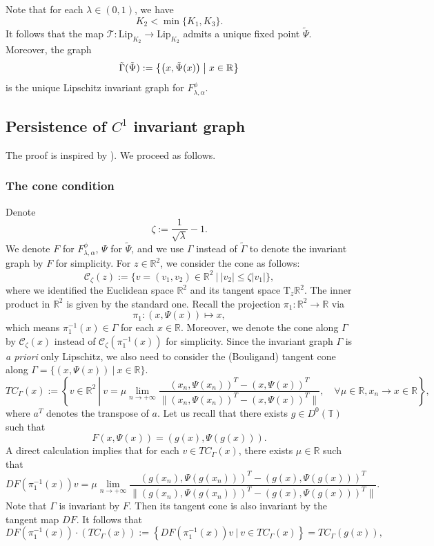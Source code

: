 \documentclass{amsart}
\newcommand{\R}{\mathbb{R}}
\newcommand{\T}{\mathbb{T}}
\begin{document}
	
	
	
	
	
	
	
	
	
	
	Note that for each $\lambda\in (0,1)$, we have
	\[K_2<\min\{K_1,K_3\}.\]
	It follows that the map $\mathcal{T} \colon \mathrm{Lip}_{K_2} \to \mathrm{Lip}_{K_2}$ admits a unique fixed point $\tilde{\Psi}$. Moreover, the graph
	\begin{equation}\label{tGp}
		\tilde{\Gamma}(\tilde{\Psi}) := \bigl\{ \bigl(x, \tilde \Psi(x)\bigr) \bigm| x \in \mathbb{R} \bigr\}
	\end{equation}
	is the unique Lipschitz invariant graph for ${F_{\lambda,\alpha}^\phi}$.
	
	
	
	
	
	
	\subsection{Persistence of $C^1$ invariant graph}
	The proof  is inspired by  \cite[Proof of Theorem 3.1]{BB}). We proceed as follows.
	\subsubsection{The cone condition}
	Denote
	\[\zeta:=\frac{1}{\sqrt{\lambda}}-1.\]
	We denote $F$ for ${F_{\lambda,\alpha}^\phi}$, $\Psi$ for $\tilde{\Psi}$, and we use $\Gamma$ instead of $\tilde{\Gamma}$ to denote the invariant graph by $F$  for simplicity.
	For $z\in\R^2$, we consider the cone  as follows:
	\[\mathcal{C}_\zeta(z):=\{v=(v_1,v_2)\in\R^2\ |\ |v_2|\leq \zeta |v_1|\},\]
	where we identified the Euclidean space $\R^2$ and its tangent space $\mathrm{T}_z\R^2$. The inner product in $\R^2$ is given by the standard one. Recall the projection $\pi_1:\R^2\to\R$ via
	\[\pi_1:(x,\Psi(x))\mapsto x,\]
	which means $\pi_1^{-1}(x)\in \Gamma$ for each $x\in\R$. Moreover, we denote the cone along $\Gamma$ by $\mathcal{C}_\zeta(x)$ instead of  $\mathcal{C}_\zeta(\pi_1^{-1}(x))$ for simplicity. Since the invariant graph $\Gamma$ is {\it a priori} only Lipschitz, we also need to consider the (Bouligand) tangent cone along $\Gamma=\{(x,\Psi(x))\ |\ x\in\R\}$.
	\[TC_\Gamma(x):=\left\{v\in\R^2\ \left|\ v=\mu\lim_{n\to+\infty}\frac{(x_n,\Psi(x_n))^T-(x,\Psi(x))^T}{\|(x_n,\Psi(x_n))^T-(x,\Psi(x))^T\|}\right.,\quad \forall \mu\in\R, x_n\to x \in \R\right\},\]
	where  $a^T$ denotes the transpose of $a$. Let us recall that there exists $g\in D^0(\T)$ such that
	\[F(x,\Psi(x))=(g(x),\Psi(g(x))).\]
	A direct calculation implies that for each $v\in TC_\Gamma(x)$, there exists $\mu\in\R$ such that
	\[DF(\pi_1^{-1}(x))v=\mu\lim_{n\to+\infty}\frac{(g(x_n),\Psi(g(x_n)))^T-(g(x),\Psi(g(x)))^T}{\|(g(x_n),\Psi(g(x_n)))^T-(g(x),\Psi(g(x)))^T\|}.\]
	Note that $\Gamma$ is invariant by $F$. Then its tangent cone is also invariant by the tangent map $DF$.
	It follows that
	\begin{equation}\label{cooncd}
		DF(\pi_1^{-1}(x))\cdot\left(TC_\Gamma(x)\right):=\left\{DF(\pi_1^{-1}(x))v\ |\ v\in TC_\Gamma(x)\right\}= TC_\Gamma(g(x)),
	\end{equation}
	
\end{document}
